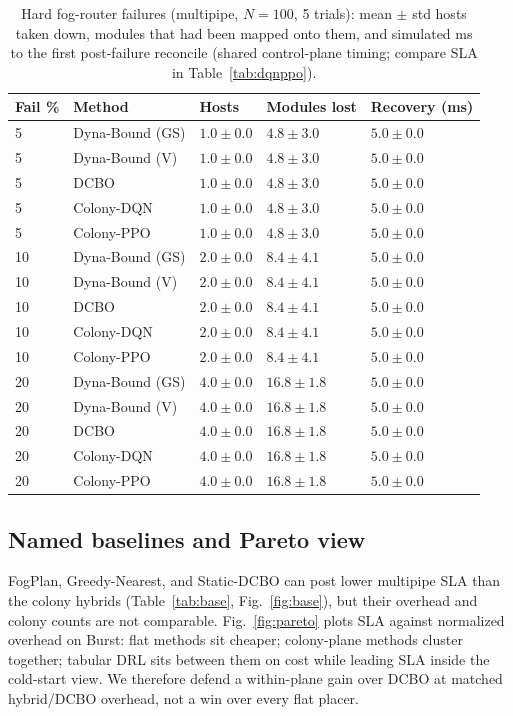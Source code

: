 \documentclass[pdflatex,sn-mathphys-num,iicol]{sn-jnl}
\begin{document}
\begin{table}[htbp]
\centering
\caption{Hard fog-router failures (multipipe, $N{=}100$, 5 trials): mean $\pm$ std
hosts taken down, modules that had been mapped onto them, and simulated ms to
the first post-failure reconcile (shared control-plane timing; compare SLA in
Table~\ref{tab:dqnppo}).}
\label{tab:fail}
\small
\begin{tabular}{@{}lllll@{}}
\toprule
Fail \% & Method & Hosts & Modules lost & Recovery (ms) \\
\midrule
5 & Dyna-Bound (GS) & $1.0{\pm}0.0$ & $4.8{\pm}3.0$ & $5.0{\pm}0.0$ \\
5 & Dyna-Bound (V) & $1.0{\pm}0.0$ & $4.8{\pm}3.0$ & $5.0{\pm}0.0$ \\
5 & DCBO & $1.0{\pm}0.0$ & $4.8{\pm}3.0$ & $5.0{\pm}0.0$ \\
5 & Colony-DQN & $1.0{\pm}0.0$ & $4.8{\pm}3.0$ & $5.0{\pm}0.0$ \\
5 & Colony-PPO & $1.0{\pm}0.0$ & $4.8{\pm}3.0$ & $5.0{\pm}0.0$ \\
10 & Dyna-Bound (GS) & $2.0{\pm}0.0$ & $8.4{\pm}4.1$ & $5.0{\pm}0.0$ \\
10 & Dyna-Bound (V) & $2.0{\pm}0.0$ & $8.4{\pm}4.1$ & $5.0{\pm}0.0$ \\
10 & DCBO & $2.0{\pm}0.0$ & $8.4{\pm}4.1$ & $5.0{\pm}0.0$ \\
10 & Colony-DQN & $2.0{\pm}0.0$ & $8.4{\pm}4.1$ & $5.0{\pm}0.0$ \\
10 & Colony-PPO & $2.0{\pm}0.0$ & $8.4{\pm}4.1$ & $5.0{\pm}0.0$ \\
20 & Dyna-Bound (GS) & $4.0{\pm}0.0$ & $16.8{\pm}1.8$ & $5.0{\pm}0.0$ \\
20 & Dyna-Bound (V) & $4.0{\pm}0.0$ & $16.8{\pm}1.8$ & $5.0{\pm}0.0$ \\
20 & DCBO & $4.0{\pm}0.0$ & $16.8{\pm}1.8$ & $5.0{\pm}0.0$ \\
20 & Colony-DQN & $4.0{\pm}0.0$ & $16.8{\pm}1.8$ & $5.0{\pm}0.0$ \\
20 & Colony-PPO & $4.0{\pm}0.0$ & $16.8{\pm}1.8$ & $5.0{\pm}0.0$ \\
\bottomrule
\end{tabular}
\end{table}

\subsection{Named baselines and Pareto view}
FogPlan, Greedy-Nearest, and Static-DCBO can post lower multipipe SLA than the
colony hybrids (Table~\ref{tab:base}, Fig.~\ref{fig:base}), but their overhead
and colony counts are not comparable. Fig.~\ref{fig:pareto} plots SLA against
normalized overhead on Burst: flat methods sit cheaper; colony-plane methods
cluster together; tabular DRL sits between them on cost while leading SLA inside
the cold-start view. We therefore defend a within-plane gain over DCBO at matched
hybrid/DCBO overhead, not a win over every flat placer.
\end{document}
